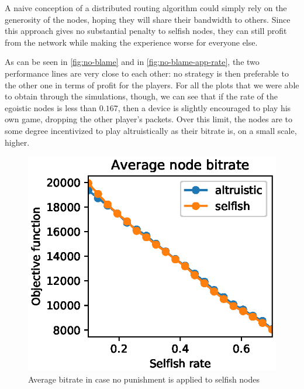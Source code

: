 \documentclass[conference]{IEEEtran}
\begin{document}

A naive conception of a distributed routing algorithm could simply rely on the generosity of the nodes, hoping they will share their bandwidth to others.
Since this approach gives no substantial penalty to selfish nodes, they can still profit from the network while making the experience worse for everyone else.

As can be seen in \autoref{fig:no-blame} and in \autoref{fig:no-blame-app-rate}, the two performance lines are very close to each other: no strategy is then  preferable to the other one in terms of profit for the players. For all the plots that we were able to obtain through the simulations, though, we can see that if the rate of the egoistic nodes is less than $0.167$, then a device is slightly encouraged to play his own game, dropping the other player's packets. Over this limit, the nodes are to some degree incentivized to play altruistically as their bitrate is, on a small scale, higher.

\begin{figure}
  \includegraphics{figures/obj_func_vs_selfish_rate_no_punish.eps}
  \caption{Average bitrate in case no punishment is applied to selfish nodes}
  \label{fig:no-blame}
\end{figure}
\end{document}
